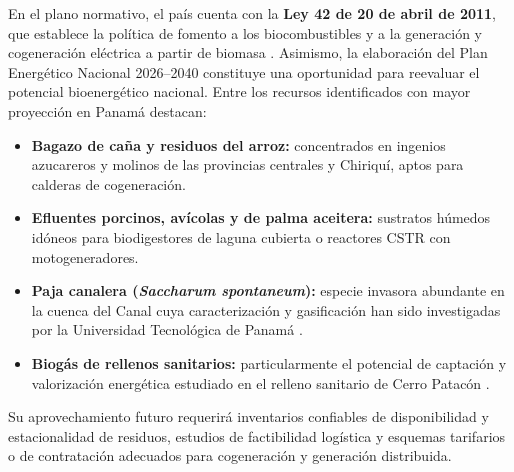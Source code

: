 En el plano normativo, el país cuenta con la \textbf{Ley 42 de 20 de abril de 2011}, que establece la política de fomento a los biocombustibles y a la generación y cogeneración eléctrica a partir de biomasa \cite{panama2011ley42}. Asimismo, la elaboración del Plan Energético Nacional 2026--2040 constituye una oportunidad para reevaluar el potencial bioenergético nacional. Entre los recursos identificados con mayor proyección en Panamá destacan:
\begin{itemize}[leftmargin=1.5em]
\item \textbf{Bagazo de caña y residuos del arroz:} concentrados en ingenios azucareros y molinos de las provincias centrales y Chiriquí, aptos para calderas de cogeneración.
\item \textbf{Efluentes porcinos, avícolas y de palma aceitera:} sustratos húmedos idóneos para biodigestores de laguna cubierta o reactores CSTR con motogeneradores.
\item \textbf{Paja canalera (\textit{Saccharum spontaneum}):} especie invasora abundante en la cuenca del Canal cuya caracterización y gasificación han sido investigadas por la Universidad Tecnológica de Panamá \cite{utp_pajacanalera}.
\item \textbf{Biogás de rellenos sanitarios:} particularmente el potencial de captación y valorización energética estudiado en el relleno sanitario de Cerro Patacón \cite{unachi_cerropatacon}.
\end{itemize}
Su aprovechamiento futuro requerirá inventarios confiables de disponibilidad y estacionalidad de residuos, estudios de factibilidad logística y esquemas tarifarios o de contratación adecuados para cogeneración y generación distribuida.
